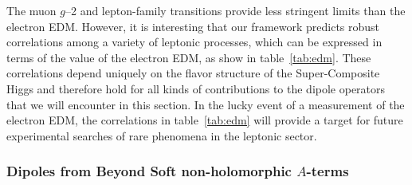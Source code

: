 \documentclass[a4paper,12pt]{article}
\def\tab#1{table~\ref{#1}}
\begin{document}
The muon $g$--2 and lepton-family transitions provide less stringent limits than the electron EDM. However, it is interesting that our framework predicts robust correlations among a variety of leptonic processes, which can be expressed in terms of the value of the electron EDM, as show in \tab{tab:edm}. These correlations depend uniquely on the flavor structure of the Super-Composite Higgs and therefore hold for all kinds of contributions to the dipole operators that we will encounter in this section. In the lucky event of a measurement of the electron EDM, the correlations in \tab{tab:edm} will provide a target for future experimental searches of rare phenomena in the leptonic sector. 

\boldmath
\subsubsection*{Dipoles from Beyond Soft non-holomorphic $A$-terms}
\unboldmath
\end{document}
